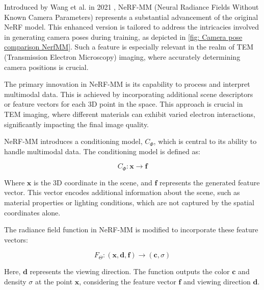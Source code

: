\label{fig:Dataset_3_with_Tanh_10000_epochs.jpg}
Introduced by Wang et al. in 2021 \cite{Wang2021}, NeRF-MM (Neural Radiance Fields Without Known Camera Parameters) represents a substantial advancement of the original NeRF model. This enhanced version is tailored to address the intricacies involved in generating camera poses during training, as depicted in \ref{fig: Camera pose comparison NerfMM}. Such a feature is especially relevant in the realm of TEM (Transmission Electron Microscopy) imaging, where accurately determining camera positions is crucial.

\vspace{10pt}

The primary innovation in NeRF-MM is its capability to process and interpret multimodal data. This is achieved by incorporating additional scene descriptors or feature vectors for each 3D point in the space. This approach is crucial in TEM imaging, where different materials can exhibit varied electron interactions, significantly impacting the final image quality.

\vspace{10pt}
NeRF-MM introduces a conditioning model, \( C_\Phi \), which is central to its ability to handle multimodal data. The conditioning model is defined as:

\begin{equation}
C_\Phi: \mathbf{x} \rightarrow \mathbf{f}
\end{equation}

Where \( \mathbf{x} \) is the 3D coordinate in the scene, and \( \mathbf{f} \) represents the generated feature vector. This vector encodes additional information about the scene, such as material properties or lighting conditions, which are not captured by the spatial coordinates alone.

\vspace{20pt}

The radiance field function in NeRF-MM is modified to incorporate these feature vectors:

\begin{equation}
F_\Theta: (\mathbf{x}, \mathbf{d}, \mathbf{f}) \rightarrow (\mathbf{c}, \sigma)
\end{equation}

Here, \( \mathbf{d} \) represents the viewing direction. The function outputs the color \( \mathbf{c} \) and density \( \sigma \) at the point \( \mathbf{x} \), considering the feature vector \( \mathbf{f} \) and viewing direction \( \mathbf{d} \).

